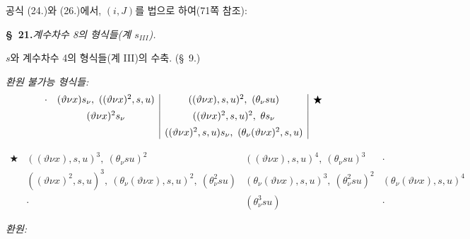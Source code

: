 공식 (24.)와 (26.)에서, $(i,J)$를 법으로 하여(71쪽 참조):

\begin{center}
\textbf{\S\ 21.}\quad\emph{계수차수 8의 형식들(계 $s_{III}$).}
\end{center}

$s$와 계수차수 4의 형식들(계 III)의 수축. (\S\ 9.)

\noindent\emph{환원 불가능 형식들:}
\[
\begin{array}{c@{\quad}c|c|c}
\cdot
& (\vartheta \nu x)s_\nu,\ ((\vartheta \nu x)^2,s,u)
& ((\vartheta \nu x),s,u)^2,\ (\theta_\nu su)
& \bigstar\\[0.45em]
& (\vartheta \nu x)^2s_\nu
& ((\vartheta \nu x)^2,s,u)^2,\ \theta s_\nu
& \\[0.45em]
&& ((\vartheta \nu x)^2,s,u)s_\nu,\ (\theta_\nu(\vartheta \nu x)^2,s,u)
&
\end{array}
\]

\[
\begin{array}{c|c|c|c}
\bigstar
& ((\vartheta \nu x),s,u)^3,\ (\theta_\nu su)^2
& ((\vartheta \nu x),s,u)^4,\ (\theta_\nu su)^3
& \cdot\\[0.45em]
& ((\vartheta \nu x)^2,s,u)^3,\ (\theta_\nu(\vartheta \nu x),s,u)^2,\ (\theta_\nu^2su)
& (\theta_\nu(\vartheta \nu x),s,u)^3,\ (\theta_\nu^2su)^2
& (\theta_\nu(\vartheta \nu x),s,u)^4\\[0.45em]
& \cdot
& (\theta_\nu^3su)
& \cdot
\end{array}
\]

\noindent\emph{환원:}

